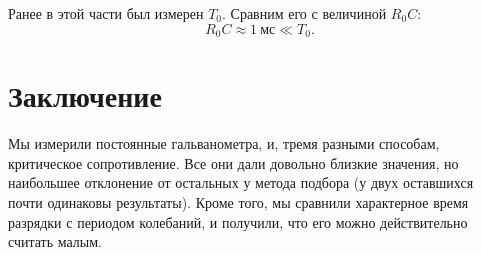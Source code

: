 \documentclass[12pt,a4paper]{article}
\begin{document}
Ранее в этой части был измерен $T_0$. Сравним его с величиной $R_0C$:
\begin{equation}
R_0C \approx 1~\text{мс} \ll T_0.
\end{equation}
\section{Заключение}
Мы измерили постоянные гальванометра, и, тремя разными способам, критическое сопротивление. Все они дали довольно близкие значения, но наибольшее отклонение от остальных у метода подбора (у двух оставшихся почти одинаковы результаты). Кроме того, мы сравнили характерное время разрядки с периодом колебаний, и получили, что его можно действительно считать малым.
\end{document}
